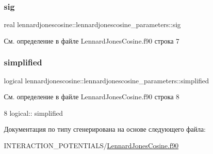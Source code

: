 \subsubsection{\texorpdfstring{sig}{sig}}
{\footnotesize\ttfamily real lennardjonescosine\+::lennardjonescosine\+\_\+parameters\+::sig}



См. определение в файле Lennard\+Jones\+Cosine.\+f90 строка 7

\mbox{\label{structlennardjonescosine_1_1lennardjonescosine__parameters_a87ce6c8b2238a6fe5ab9679c238b3746}} 
\subsubsection{\texorpdfstring{simplified}{simplified}}
{\footnotesize\ttfamily logical lennardjonescosine\+::lennardjonescosine\+\_\+parameters\+::simplified}



См. определение в файле Lennard\+Jones\+Cosine.\+f90 строка 8


\begin{DoxyCode}
8     \textcolor{keywordtype}{logical}:: simplified
\end{DoxyCode}


Документация по типу сгенерирована на основе следующего файла\+:\begin{DoxyCompactItemize}
\item 
I\+N\+T\+E\+R\+A\+C\+T\+I\+O\+N\+\_\+\+P\+O\+T\+E\+N\+T\+I\+A\+L\+S/\mbox{\hyperlink{_lennard_jones_cosine_8f90}{Lennard\+Jones\+Cosine.\+f90}}\end{DoxyCompactItemize}

